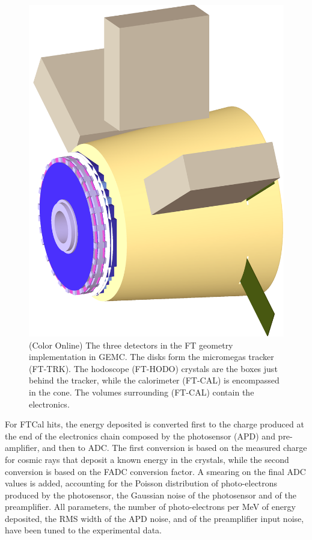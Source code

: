 \begin{figure}[h]
	\centering
	\includegraphics[width=0.99\columnwidth,keepaspectratio]{img/ftGeometry.png}
	\caption{(Color Online) The three detectors in the FT geometry implementation in GEMC.
             The disks form the micromegas tracker (FT-TRK). The hodoscope (FT-HODO) crystals are the boxes just behind the tracker,
			 while the calorimeter (FT-CAL) is encompassed in the cone. The volumes surrounding (FT-CAL) contain the electronics.}
	\label{fig:ftGeometry}
\end{figure}

For FTCal hits, the energy deposited is converted first to the charge produced at the end of the electronics chain composed
by the photosensor (APD) and pre-amplifier, and then to ADC.
The first conversion is based on the measured charge for cosmic rays that deposit a known energy in the crystals,
while the second conversion is based on the FADC conversion factor. A smearing on the final ADC values is added,
accounting for the Poisson distribution of photo-electrons produced by the photosensor, the Gaussian noise of the
photosensor and of the preamplifier. All parameters, the number of photo-electrons per MeV of energy deposited,
the RMS width of the APD noise, and of the preamplifier input noise, have been tuned to the experimental data.


